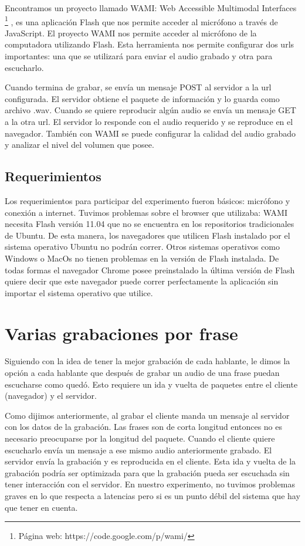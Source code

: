 Encontramos un proyecto llamado WAMI: Web Accessible Multimodal Interfaces \footnote{Página web: https://code.google.com/p/wami/} , es una aplicación Flash que nos permite acceder al micrófono a través de JavaScript. El proyecto WAMI nos permite acceder al micrófono de la computadora utilizando Flash. Esta herramienta nos permite configurar dos urls importantes: una que se utilizará para enviar el audio grabado y otra para escucharlo.  

Cuando termina de grabar, se envía un mensaje POST al servidor a la url configurada. El servidor obtiene el paquete de información y lo guarda como archivo .wav. Cuando se quiere reproducir algún audio se envía un mensaje GET a la otra url. El servidor lo responde con el audio requerido y se reproduce en el navegador. También con WAMI se puede configurar la calidad del audio grabado y analizar el nivel del volumen que posee. 

\subsection{Requerimientos}

Los requerimientos para participar del experimento fueron básicos: micrófono y conexión a internet. Tuvimos problemas sobre el browser que utilizaba: WAMI necesita Flash versión 11.04 que no se encuentra en los repositorios tradicionales de Ubuntu. De esta manera, los navegadores que utilicen Flash instalado por el sistema operativo Ubuntu no podrán correr. Otros sistemas operativos como Windows o MacOs no tienen problemas en la versión de Flash instalada. De todas formas el navegador Chrome posee preinstalado la última versión de Flash quiere decir que este navegador puede correr perfectamente la aplicación sin importar el sistema operativo que utilice.

\section{Varias grabaciones por frase}

Siguiendo con la idea de tener la mejor grabación de cada hablante, le dimos la opción a cada hablante que después de grabar un audio de una frase puedan escucharse como quedó. Esto requiere un ida y vuelta de paquetes entre el cliente (navegador) y el servidor. 

Como dijimos anteriormente, al grabar el cliente manda un mensaje al servidor con los datos de la grabación. Las frases son de corta longitud entonces no es necesario preocuparse por la longitud del paquete. Cuando el cliente quiere escucharlo envía un mensaje a ese mismo audio anteriormente grabado. El servidor envía la grabación y es reproducida en el cliente. Esta ida y vuelta de la grabación podría ser optimizada para que la grabación pueda ser escuchada sin tener interacción con el servidor. En nuestro experimento, no tuvimos problemas graves en lo que respecta a latencias pero si es un punto débil del sistema que hay que tener en cuenta.


